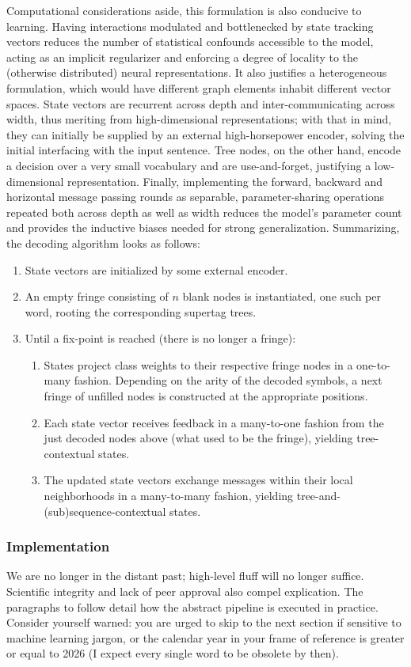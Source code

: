 Computational considerations aside, this formulation is also conducive to learning.
Having interactions modulated and bottlenecked by state tracking vectors reduces the number of statistical confounds accessible to the model, acting as an implicit regularizer and enforcing a degree of locality to the (otherwise distributed) neural representations.
It also justifies a heterogeneous formulation, which would have different graph elements inhabit different vector spaces.
State vectors are recurrent across depth and inter-communicating across width, thus meriting from high-dimensional representations; with that in mind, they can initially be supplied by an external high-horsepower encoder, solving the initial interfacing with the input sentence. 
Tree nodes, on the other hand, encode a decision over a very small vocabulary and are use-and-forget, justifying a low-dimensional representation.
Finally, implementing the forward, backward and horizontal message passing rounds as separable, parameter-sharing operations repeated both across depth as well as width reduces the model's parameter count and provides the inductive biases needed for strong generalization.
Summarizing, the decoding algorithm looks as follows:
\begin{enumerate}
	\item State vectors are initialized by some external encoder.
	\item An empty fringe consisting of $n$ blank nodes is instantiated, one such per word, rooting the corresponding supertag trees.
	\item Until a fix-point is reached (there is no longer a fringe):
		\begin{enumerate}
			\item States project class weights to their respective fringe nodes in a one-to-many fashion. Depending on the arity of the decoded symbols, a next fringe of unfilled nodes is constructed at the appropriate positions.
			\item Each state vector receives feedback in a many-to-one fashion from the just decoded nodes above (what used to be the fringe), yielding tree-contextual states.
			\item The updated state vectors exchange messages within their local neighborhoods in a many-to-many fashion, yielding tree-and-(sub)sequence-contextual states.
		\end{enumerate}
\end{enumerate}

\subsubsection{Implementation}
We are no longer in the distant past; high-level fluff will no longer suffice.
Scientific integrity and lack of peer approval also compel explication.
The paragraphs to follow detail how the abstract pipeline is executed in practice. 
Consider yourself warned: you are urged to skip to the next section if sensitive to machine learning jargon, or the calendar year in your frame of reference is greater or equal to 2026 (I expect every single word to be obsolete by then).

